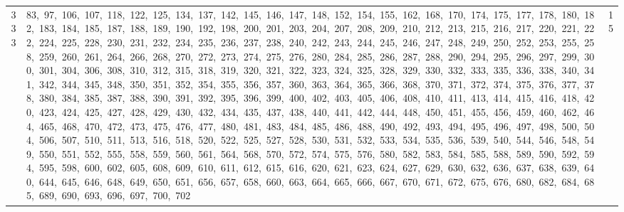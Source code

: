 \begin{longtable}{c|p{}|r}
333 & 83,\ 97,\ 106,\ 107,\ 118,\ 122,\ 125,\ 134,\ 137,\ 142,\ 145,\ 146,\ 147,\ 148,\ 152,\ 154,\ 155,\ 162,\ 168,\ 170,\ 174,\ 175,\ 177,\ 178,\ 180,\ 182,\ 183,\ 184,\ 185,\ 187,\ 188,\ 189,\ 190,\ 192,\ 198,\ 200,\ 201,\ 203,\ 204,\ 207,\ 208,\ 209,\ 210,\ 212,\ 213,\ 215,\ 216,\ 217,\ 220,\ 221,\ 222,\ 224,\ 225,\ 228,\ 230,\ 231,\ 232,\ 234,\ 235,\ 236,\ 237,\ 238,\ 240,\ 242,\ 243,\ 244,\ 245,\ 246,\ 247,\ 248,\ 249,\ 250,\ 252,\ 253,\ 255,\ 258,\ 259,\ 260,\ 261,\ 264,\ 266,\ 268,\ 270,\ 272,\ 273,\ 274,\ 275,\ 276,\ 280,\ 284,\ 285,\ 286,\ 287,\ 288,\ 290,\ 294,\ 295,\ 296,\ 297,\ 299,\ 300,\ 301,\ 304,\ 306,\ 308,\ 310,\ 312,\ 315,\ 318,\ 319,\ 320,\ 321,\ 322,\ 323,\ 324,\ 325,\ 328,\ 329,\ 330,\ 332,\ 333,\ 335,\ 336,\ 338,\ 340,\ 341,\ 342,\ 344,\ 345,\ 348,\ 350,\ 351,\ 352,\ 354,\ 355,\ 356,\ 357,\ 360,\ 363,\ 364,\ 365,\ 366,\ 368,\ 370,\ 371,\ 372,\ 374,\ 375,\ 376,\ 377,\ 378,\ 380,\ 384,\ 385,\ 387,\ 388,\ 390,\ 391,\ 392,\ 395,\ 396,\ 399,\ 400,\ 402,\ 403,\ 405,\ 406,\ 408,\ 410,\ 411,\ 413,\ 414,\ 415,\ 416,\ 418,\ 420,\ 423,\ 424,\ 425,\ 427,\ 428,\ 429,\ 430,\ 432,\ 434,\ 435,\ 437,\ 438,\ 440,\ 441,\ 442,\ 444,\ 448,\ 450,\ 451,\ 455,\ 456,\ 459,\ 460,\ 462,\ 464,\ 465,\ 468,\ 470,\ 472,\ 473,\ 475,\ 476,\ 477,\ 480,\ 481,\ 483,\ 484,\ 485,\ 486,\ 488,\ 490,\ 492,\ 493,\ 494,\ 495,\ 496,\ 497,\ 498,\ 500,\ 504,\ 506,\ 507,\ 510,\ 511,\ 513,\ 516,\ 518,\ 520,\ 522,\ 525,\ 527,\ 528,\ 530,\ 531,\ 532,\ 533,\ 534,\ 535,\ 536,\ 539,\ 540,\ 544,\ 546,\ 548,\ 549,\ 550,\ 551,\ 552,\ 555,\ 558,\ 559,\ 560,\ 561,\ 564,\ 568,\ 570,\ 572,\ 574,\ 575,\ 576,\ 580,\ 582,\ 583,\ 584,\ 585,\ 588,\ 589,\ 590,\ 592,\ 594,\ 595,\ 598,\ 600,\ 602,\ 605,\ 608,\ 609,\ 610,\ 611,\ 612,\ 615,\ 616,\ 620,\ 621,\ 623,\ 624,\ 627,\ 629,\ 630,\ 632,\ 636,\ 637,\ 638,\ 639,\ 640,\ 644,\ 645,\ 646,\ 648,\ 649,\ 650,\ 651,\ 656,\ 657,\ 658,\ 660,\ 663,\ 664,\ 665,\ 666,\ 667,\ 670,\ 671,\ 672,\ 675,\ 676,\ 680,\ 682,\ 684,\ 685,\ 689,\ 690,\ 693,\ 696,\ 697,\ 700,\ 702 & 15 \\

\end{longtable}
